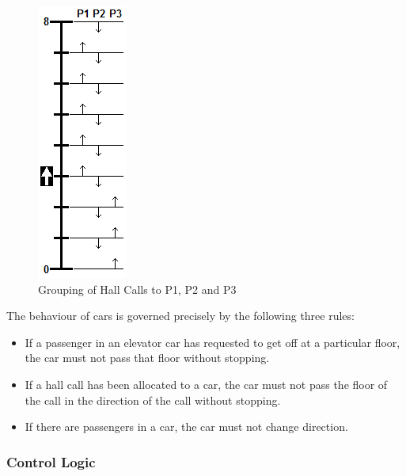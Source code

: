 \documentclass{UoYCSproject}
\begin{document}
\begin{figure} [h]
	\centering
	\includegraphics{P1_P2_P3_illustration.png}
	\caption{Grouping of Hall Calls to P1, P2 and P3}
	\label{p1p2p3}
\end{figure}

The behaviour of cars is governed precisely by the following three rules:
\begin{itemize}
	\item If a passenger in an elevator car has requested to get off at a particular floor, the car must not pass that floor without stopping.
	\item If a hall call has been allocated to a car, the car must not pass the floor of the call in the direction of the call without stopping.
	\item If there are passengers in a car, the car must not change direction.
\end{itemize}

\subsubsection{Control Logic}
\end{document}
